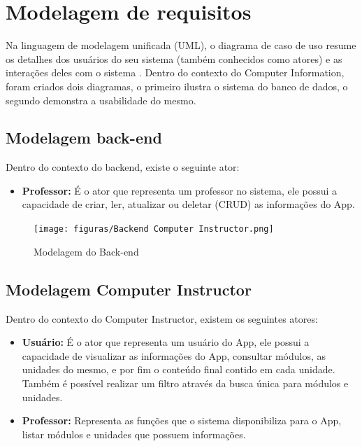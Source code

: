

\section{Modelagem de requisitos}
\label{modelagem}

Na linguagem de modelagem unificada (UML), o diagrama de caso de uso resume os detalhes dos usuários do seu sistema (também conhecidos como atores) e as interações deles com o sistema \cite{lucidchart2021uml}. Dentro do contexto do Computer Information, foram criados dois diagramas, o primeiro ilustra o sistema do banco de dados, o segundo demonstra a usabilidade do mesmo.

\subsection{Modelagem back-end}
\label{modelagem_back_end}
Dentro do contexto do backend, existe o seguinte ator:

\begin{itemize}

    \item \textbf{Professor:} É o ator que representa um professor no sistema, ele possui a capacidade de criar, ler, atualizar ou deletar (CRUD) as informações do App.

\end{itemize}

\begin{figure}[H]
    \centering
    \caption{Modelagem do Back-end}
    \texttt{[image: figuras/Backend  Computer Instructor.png]}
    \label{fig:modelagemDoBackend}
    {}
\end{figure}

\subsection{Modelagem Computer Instructor}
\label{modelagem_computer_instructor}

Dentro do contexto do  Computer Instructor, existem os seguintes atores:

\begin{itemize}
    \item \textbf{Usuário:} É o ator que representa um usuário do App, ele possui a capacidade de visualizar as informações do App, consultar módulos, as unidades do mesmo, e por fim o conteúdo final contido em cada unidade. Também é possível realizar um filtro através da busca única para módulos e unidades.

    \item \textbf{Professor:} Representa as funções que o sistema disponibiliza para o App, listar módulos e unidades que possuem informações.

\end{itemize}

